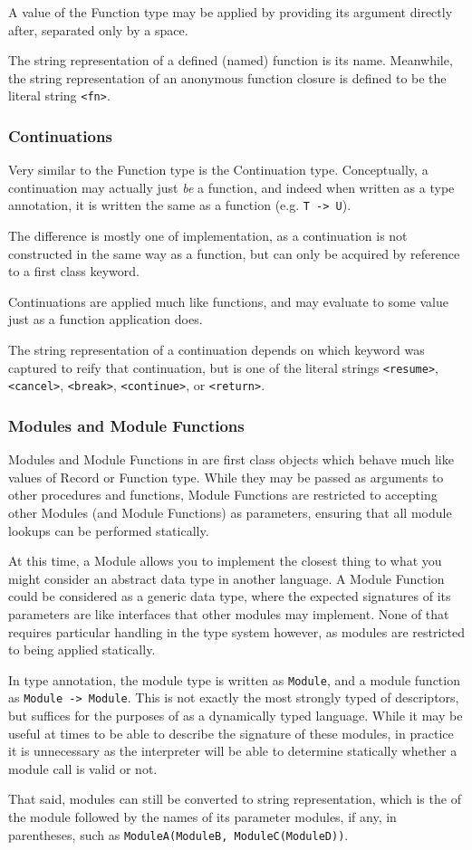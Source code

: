 A value of the Function type may be applied by providing its argument directly after,
separated only by a space.

The string representation of a defined (named) function is its name. Meanwhile, the
string representation of an anonymous function closure is defined to be the literal
string \texttt{<fn>}.

\subsubsection{Continuations}

Very similar to the Function type is the Continuation type. Conceptually, a continuation
may actually just \emph{be} a function, and indeed when written as a type annotation, it
is written the same as a function (e.g. \texttt{T -> U}).

The difference is mostly one of implementation, as a continuation is not constructed in
the same way as a function, but can only be acquired by reference to a first class keyword.

Continuations are applied much like functions, and may evaluate to some value just as a
function application does.

The string representation of a continuation depends on which keyword was captured to
reify that continuation, but is one of the literal strings \texttt{<resume>}, \texttt{<cancel>},
\texttt{<break>}, \texttt{<continue>}, or \texttt{<return>}.

\subsubsection{Modules and Module Functions}

Modules and Module Functions in \Trilogy{} are first class objects which behave much
like values of Record or Function type. While they may be passed as arguments
to other procedures and functions, Module Functions are restricted to accepting other
Modules (and Module Functions) as parameters, ensuring that all module lookups can be
performed statically.

At this time, a Module allows you to implement the closest thing to what you might
consider an abstract data type in another language. A Module Function could be considered
as a generic data type, where the expected signatures of its parameters are like interfaces that
other modules may implement. None of that requires particular handling in the type system
however, as modules are restricted to being applied statically.

In type annotation, the module type is written as \texttt{Module}, and a module function
as \texttt{Module -> Module}. This is not exactly the most strongly typed of descriptors,
but suffices for the purposes of \Trilogy{} as a dynamically typed language. While it may
be useful at times to be able to describe the signature of these modules, in practice it
is unnecessary as the interpreter will be able to determine statically whether a module
call is valid or not.

That said, modules can still be converted to string representation, which is the
of the module followed by the names of its parameter modules, if any, in parentheses,
such as \texttt{ModuleA(ModuleB, ModuleC(ModuleD))}.
